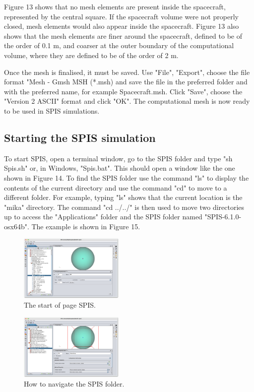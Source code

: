 \documentclass[a4paper, 11pt]{article}
\begin{document}
Figure 13 shows that no mesh elements are present inside the spacecraft, represented by the central square. If the spacecraft volume were not properly closed, mesh elements would also appear inside the spacecraft. Figure 13 also shows that the mesh elements are finer around the spacecraft, defined to be of the order of 0.1 m, and coarser at the outer boundary of the computational volume, where they are defined to be of the order of 2 m.\par
Once the mesh is finalised, it must be saved. Use "File", "Export", choose the file format "Mesh - Gmsh MSH (*.msh) and save the file in the preferred folder and with the preferred name, for example Spacecraft.msh. Click "Save", choose the "Version 2 ASCII" format and click "OK". The computational mesh is now ready to be used in SPIS simulations.

\subsection{Starting the SPIS simulation}

To start SPIS, open a terminal window, go to the SPIS folder and type "sh Spis.sh" or, in Windows, "Spis.bat". This should open a window like the one shown in Figure 14. To find the SPIS folder use the command "ls" to display the contents of the current directory and use the command "cd" to move to a different folder. For example, typing "ls" shows that the current location is the "mika" directory. The command "cd ../../" is then used to move two directories up to access the "Applications" folder and the SPIS folder named "SPIS-6.1.0-osx64b". The example is shown in Figure 15.

\begin{figure}[!ht]
    \centering
    \includegraphics[width=0.45\textwidth]{fig14.jpg}
    \caption{The start of page SPIS.}
\end{figure}

\begin{figure}[!ht]
    \centering
    \includegraphics[width=0.45\textwidth]{fig15.jpg}
    \caption{How to navigate the SPIS folder.}
\end{figure}
\end{document}
